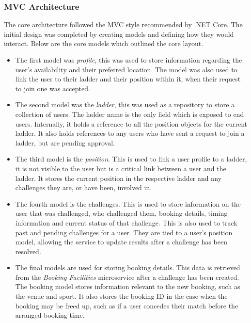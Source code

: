 \subsubsection{MVC Architecture}
\par
The core architecture followed the MVC style recommended by .NET Core. The initial design was completed by creating models and defining how they would interact. Below are the core models which outlined the core layout.

\begin{itemize}

	\item The first model was \textit{profile}, this was used to store information regarding the user's availability and their preferred location. The model was also used to link the user to their ladder and their position within it, when their request to join one was accepted.

	\item The second model was the \textit{ladder}, this was used as a repository to store a collection of users. The ladder name is the only field which is exposed to end users. Internally, it holds a reference to all the position objects for the current ladder. It also holds references to any users who have sent a request to join a ladder, but are pending approval.

	\item The third model is the \textit{position}. This is used to link a user profile to a ladder, it is not visible to the user but is a critical link between a user and the ladder. It stores the current position in the respective ladder and any challenges they are, or have been, involved in.

	\item The fourth model is the challenges. This is used to store information on the user that was challenged, who challenged them, booking details, timing information and current status of that challenge. This is also used to track past and pending challenges for a user. They are tied to a user’s position model, allowing the service to update results after a challenge has been resolved.

	\item The final models are used for storing booking details. This data is retrieved from the \textit{Booking Facilities} microservice after a challenge has been created. The booking model stores information relevant to the new booking, such as the venue and sport. It also stores the booking ID in the case when the booking may be freed up, such as if a user concedes their match before the arranged booking time.

\end{itemize}

